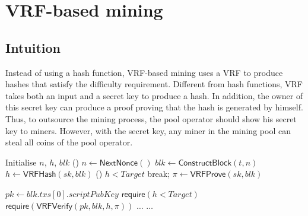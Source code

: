\section{VRF-based mining}

\subsection{Intuition}
Instead of using a hash function, VRF-based mining uses a VRF to produce hashes that satisfy the difficulty requirement.
Different from hash functions, VRF takes both an input and a secret key to produce a hash.
In addition, the owner of this secret key can produce a proof proving that the hash is generated by himself.
Thus, to outsource the mining process, the pool operator should show his secret key to miners.
However, with the secret key, any miner in the mining pool can steal all coins of the pool operator.



\begin{algorithm}[]
\caption{$\mathsf{Work}(sk, t, Target)$.}
\label{algo:work}
\SetAlgoLined
{}
  Initialise $n$, $h$, $blk$ 
  \While () {$n \gets \mathsf{NextNonce}()$}{
    $blk \gets \mathsf{ConstructBlock}(t, n)$ 
    $h \gets \mathsf{VRFHash}(sk, blk)$ 
    \If () {$h < Target$}{
      break; 
    }
  }
  $\pi \gets \mathsf{VRFProve}(sk, blk)$ 
   
\end{algorithm}





\begin{algorithm}[h]
\caption{$\mathsf{Verify}(blk, h, \pi, Target)$}
\label{algo:verify}
\SetAlgoLined
$pk \gets blk . txs[0] . scriptPubKey$ 
$\mathsf{require}(h < Target)$ 
$\mathsf{require}(\mathsf{VRFVerify}(pk, blk, h, \pi))$ \;
$\dots$ 
$\dots$ 
\end{algorithm}

